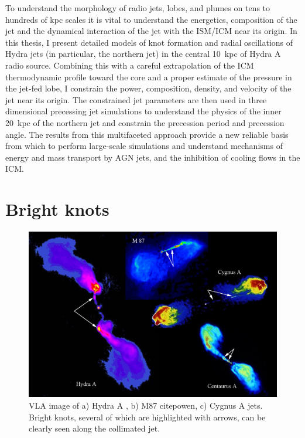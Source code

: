 To understand the morphology of radio jets, lobes, and plumes on tens to hundreds of kpc scales it is vital to understand the energetics, composition of the jet and the dynamical interaction of the jet with the ISM/ICM near its origin. In this thesis, I present detailed models of knot formation and radial oscillations of Hydra jets (in particular, the northern jet) in the central 10~kpc of Hydra A radio source. Combining this with a careful extrapolation of the ICM thermodynamic profile toward the core and a proper estimate of the pressure in the jet-fed lobe, I constrain the power, composition, density, and velocity of the jet near its origin. The constrained jet parameters are then used in three dimensional precessing jet simulations to understand the physics of the inner 20~kpc of the northern jet and constrain the precession period and precession angle. The results from this multifaceted approach provide a new reliable basis from which to perform large-scale simulations and understand mechanisms of energy and mass transport by AGN jets, and the inhibition of cooling flows in the ICM.


\section{Bright knots}

\begin{figure}
\centering
\includegraphics[width=\linewidth]{bright_knots.jpg}
\caption{VLA image of a) Hydra A \citep{taylor90}, b) M87 citep{owen}, c) Cygnus A jets. Bright knots, several of which are highlighted with arrows, can be clearly seen along the collimated jet.}
\label{knot}
\end{figure}


